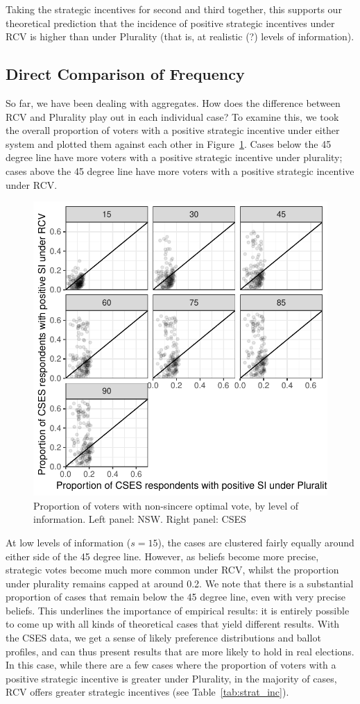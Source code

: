 \documentclass[11pt, letter]{article}
\begin{document}
Taking the strategic incentives for second and third together, this supports our theoretical prediction that the incidence of positive strategic incentives under RCV is higher than under Plurality (that is, at realistic (?) levels of information).

\subsection{Direct Comparison of Frequency}

So far, we have been dealing with aggregates. How does the difference between RCV and Plurality play out in each individual case? To examine this, we took the overall proportion of voters with a positive strategic incentive under either system and plotted them against each other in Figure~\ref{fig:sv_dist}. Cases below the 45 degree line have more voters with a positive strategic incentive under plurality; cases above the 45 degree line have more voters with a positive strategic incentive under RCV.

\begin{figure}[!h]
	\centering
	\includegraphics[width = .6 \textwidth]{"../output/figures/cses_prop"}
	\caption{Proportion of voters with non-sincere optimal vote, by level of information. Left panel: NSW. Right panel: CSES}
	\label{fig:sv_dist}
\end{figure}

At low levels of information ($s = 15$), the cases are clustered fairly equally around either side of the 45 degree line. However, as beliefs become more precise, strategic votes become much more common under RCV, whilst the proportion under plurality remains capped at around 0.2. We note that there is a substantial proportion of cases that remain below the 45 degree line, even with very precise beliefs. This underlines the importance of empirical results: it is entirely possible to come up with all kinds of theoretical cases that yield different results. With the CSES data, we get a sense of likely preference distributions and ballot profiles, and can thus present results that are more likely to hold in real elections. In this case, while there are a few cases where the proportion of voters with a positive strategic incentive is greater under Plurality, in the majority of cases, RCV offers greater strategic incentives (see Table~\ref{tab:strat_inc}).
\end{document}
